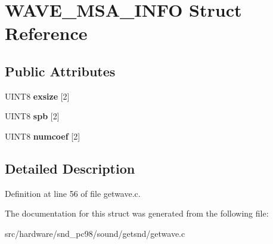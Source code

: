 \hypertarget{structWAVE__MSA__INFO}{\section{W\-A\-V\-E\-\_\-\-M\-S\-A\-\_\-\-I\-N\-F\-O Struct Reference}
\label{structWAVE__MSA__INFO}
}
\subsection*{Public Attributes}
\begin{DoxyCompactItemize}
\item 
\hypertarget{structWAVE__MSA__INFO_ad91a502238d00046458f8ec70db9dcc0}{U\-I\-N\-T8 {\bfseries exsize} \mbox{[}2\mbox{]}}\label{structWAVE__MSA__INFO_ad91a502238d00046458f8ec70db9dcc0}

\item 
\hypertarget{structWAVE__MSA__INFO_a1446580627499b51f87f1a14c172b453}{U\-I\-N\-T8 {\bfseries spb} \mbox{[}2\mbox{]}}\label{structWAVE__MSA__INFO_a1446580627499b51f87f1a14c172b453}

\item 
\hypertarget{structWAVE__MSA__INFO_ad6d32777bba1342defc1b6b9047660ea}{U\-I\-N\-T8 {\bfseries numcoef} \mbox{[}2\mbox{]}}\label{structWAVE__MSA__INFO_ad6d32777bba1342defc1b6b9047660ea}

\end{DoxyCompactItemize}


\subsection{Detailed Description}


Definition at line 56 of file getwave.\-c.



The documentation for this struct was generated from the following file\-:\begin{DoxyCompactItemize}
\item 
src/hardware/snd\-\_\-pc98/sound/getsnd/getwave.\-c\end{DoxyCompactItemize}
